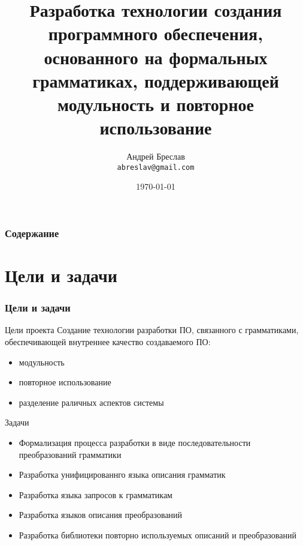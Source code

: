 \documentclass[paper=screen,10pt,unicode]{beamer}
\author{Андрей Бреслав \\ \texttt{abreslav@gmail.com}}
\institute[ИТМО]{СПбГУ ИТМО}
\title[Grammarware Engineering]{Разработка технологии создания программного обеспечения,
основанного на формальных грамматиках, поддерживающей
модульность и повторное использование}
\date{\today}
\begin{document}
\begin{frame}
	\titlepage
\end{frame}

\begin{frame}
	\frametitle{Содержание}
	\tableofcontents
\end{frame}

\section{Цели и задачи}
\begin{frame}
	\frametitle{Цели и задачи}

	\begin{block}{Цели проекта}
		Создание технологии разработки ПО, связанного с грамматиками, 
		обеспечивающей внутреннее качество создаваемого ПО:
		\begin{itemize}
			\item модульность
			\item повторное использование
			\item разделение раличных аспектов системы
		\end{itemize}
	\end{block}
	
	\begin{block}{Задачи}
		\begin{itemize}
			\item Формализация процесса разработки в виде последовательности преобразований грамматики
			\item Разработка унифицированнго языка описания грамматик
			\item Разработка языка запросов к грамматикам
			\item Разработка языков описания преобразований
			\item Разработка библиотеки повторно используемых описаний и преобразований
		\end{itemize}
	\end{block}
\end{frame}
\end{document}
